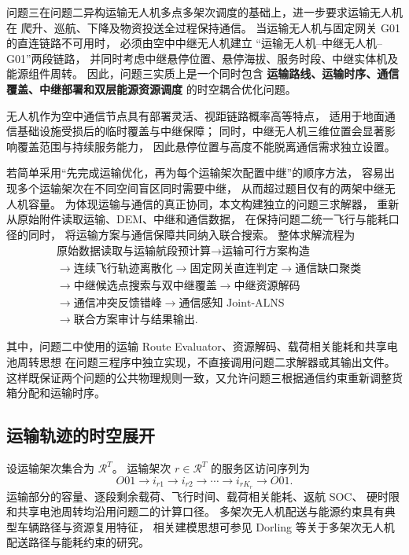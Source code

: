 问题三在问题二异构运输无人机多点多架次调度的基础上，进一步要求运输无人机在
爬升、巡航、下降及物资投送全过程保持通信。
当运输无人机与固定网关 G01 的直连链路不可用时，
必须由空中中继无人机建立
“运输无人机--中继无人机--G01”两段链路，
并同时考虑中继悬停位置、悬停海拔、服务时段、中继实体机及能源组件周转。
因此，问题三实质上是一个同时包含
\textbf{运输路线、运输时序、通信覆盖、中继部署和双层能源资源调度}
的时空耦合优化问题。

无人机作为空中通信节点具有部署灵活、视距链路概率高等特点，
适用于地面通信基础设施受损后的临时覆盖与中继保障\cite{q3-zeng2016}；
同时，中继无人机三维位置会显著影响覆盖范围与持续服务能力，
因此悬停位置与高度不能脱离通信需求独立设置\cite{q3-mozaffari2016}。

若简单采用“先完成运输优化，再为每个运输架次配置中继”的顺序方法，
容易出现多个运输架次在不同空间盲区同时需要中继，
从而超过题目仅有的两架中继无人机容量。
为体现运输与通信的真正协同，本文构建独立的问题三求解器，
重新从原始附件读取运输、DEM、中继和通信数据，
在保持问题二统一飞行与能耗口径的同时，
将运输方案与通信保障共同纳入联合搜索。
整体求解流程为
\[
\boxed{
	\begin{aligned}
		&\text{原始数据读取与运输航段预计算}
		\rightarrow \text{运输可行方案构造} \\
		&\rightarrow \text{连续飞行轨迹离散化}
		\rightarrow \text{固定网关直连判定}
		\rightarrow \text{通信缺口聚类} \\
		&\rightarrow \text{中继候选点搜索与双中继覆盖}
		\rightarrow \text{中继资源解码} \\
		&\rightarrow \text{通信冲突反馈错峰}
		\rightarrow \text{通信感知 Joint-ALNS} \\
		&\rightarrow \text{联合方案审计与结果输出}.
\end{aligned}}
\]

其中，问题二中使用的运输 Route Evaluator、资源解码、载荷相关能耗和共享电池周转思想
在问题三程序中独立实现，不直接调用问题二求解器或其输出文件。
这样既保证两个问题的公共物理规则一致，又允许问题三根据通信约束重新调整货箱分配和运输时序。

\subsection{运输轨迹的时空展开}

设运输架次集合为 $\mathcal{R}^{T}$。
运输架次 $r\in\mathcal{R}^{T}$ 的服务区访问序列为
\[
O01\rightarrow i_{r1}\rightarrow i_{r2}
\rightarrow\cdots\rightarrow i_{rK_r}\rightarrow O01.
\]
运输部分的容量、逐段剩余载荷、飞行时间、载荷相关能耗、返航 SOC、
硬时限和共享电池周转均沿用问题二的计算口径。
多架次无人机配送与能源约束具有典型车辆路径与资源复用特征，
相关建模思想可参见 Dorling 等关于多架次无人机配送路径与能耗约束的研究\cite{q3-dorling2017}。

